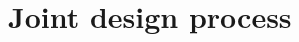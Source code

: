 \documentclass[11pt, twocolumn]{article}
\begin{document}





\section{Joint design process}
\label{sec:design}
\end{document}

